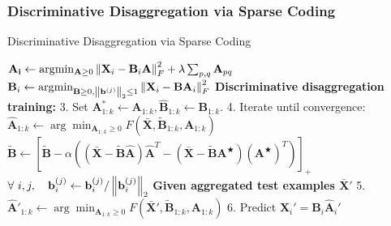 \subsubsection{Discriminative Disaggregation via Sparse Coding}
\label{alg:ddsc}
%
\begin{algorithm}[H]
\caption{Discriminative Disaggregation via Sparse Coding}
\begin{algorithmic}[1]
\Statex \hspace{0.4in} $\mathbf{A_i} \leftarrow \arg \! \min_{\mathbf{A} \geq 0} \left\lVert\mathbf{X}_i - \mathbf{B}_i\mathbf{A}\right\rVert_F^2 + \lambda \sum_{p,q} \mathbf{A}_{pq}$
\Statex \hspace{0.4in} $\mathbf{B}_i \leftarrow  \arg \! \min_{\mathbf{B} \geq 0,\left\lVert\mathbf{b}^{(j)}\right\rVert_2 \leq 1} \left\lVert\mathbf{X}_i - \mathbf{B} \mathbf{A}_i \right\rVert_F^2$
\Statex \textbf{Discriminative disaggregation training:}
\Statex  \hspace{0.2in} 3. Set $\mathbf{A}_{1:k}^* \leftarrow \mathbf{A}_{1:k},\hat{\mathbf{B}}_{1:k} \leftarrow \mathbf{B}_{1:k}.$
\Statex  \hspace{0.2in} 4. Iterate until convergence:
\Statex \hspace{0.4in} $\hat{\mathbf{A}}_{1:k} \leftarrow \arg \! \min_{\mathbf{A}_{1:k} \geq 0} F\left( \bar{\mathbf{X}},\tilde{\mathbf{B}}_{1:k},\mathbf{A}_{1:k} \right)$
\Statex \hspace{0.4in} $\tilde{\mathbf{B}} \leftarrow \left[ \tilde{\mathbf{B}} - \alpha \left( (\bar{\mathbf{X}} - \tilde{\mathbf{B}}\hat{\mathbf{A}})\hat{\mathbf{A}}^T - (\bar{\mathbf{X}}-\tilde{\mathbf{B}}\mathbf{A}^\bigstar)(\mathbf{A}^\bigstar)^T \right) \right]_+$
\Statex \hspace{0.4in} $\forall \  i,j, \quad \mathbf{b}_i^{(j)} \leftarrow \mathbf{b}_i^{(j)} / \left\lVert\mathbf{b}_i^{(j)}\right\rVert_2$
\Statex \textbf{Given aggregated test examples $\bar{\mathbf{X}}'$}
\Statex \hspace{0.2in} 5. $\hat{\mathbf{A}}'_{1:k} \leftarrow \arg \! \min_{\mathbf{A}_{1:k} \geq 0} F(\bar{\mathbf{X}}',\tilde{\mathbf{B}}_{1:k},\mathbf{A}_{1:k})$
\Statex \hspace{0.2in} 6. Predict $\hat{\mathbf{X}}_i' = \mathbf{B}_i\hat{\mathbf{A}}_i'$
\end{algorithmic}
\end{algorithm}